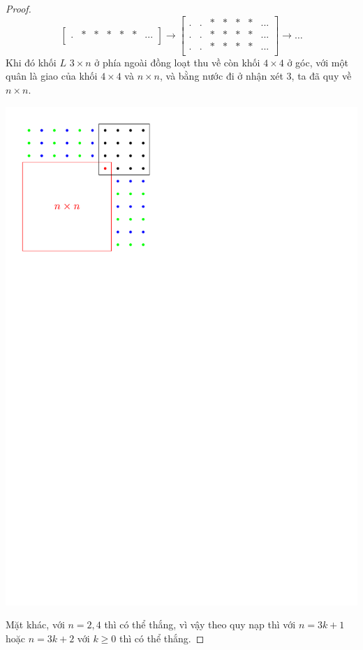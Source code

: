 \documentclass[11pt]{scrartcl}
\begin{document}
\begin{itemize}[label=, leftmargin=0em, itemsep=0.5em]
\begin{sol}
\begin{proof}
\[\begin{bmatrix}
                    . & * & *&*&*&*&...\\
                \end{bmatrix}
            \to 
                \begin{bmatrix}
                    . & . & *&*&*&*&...\\
                    . & . & *&*&*&*&...\\
                    . & . & *&*&*&*&...\\
                \end{bmatrix}
                \to \dots
            \]
            Khi đó khối $L$ $3 \times n$ ở phía ngoài đồng loạt thu về còn khối $4 \times 4$ ở góc, với một quân là giao của khối $4 \times 4$ và $n \times n$, và bằng nước đi ở nhận xét 3, ta đã quy về $n \times n$.
            \begin{center}
                \includegraphics[scale=0.7]{Image/1993.pdf}
            \end{center}
            Mặt khác, với $n = 2,4$ thì có thể thắng, vì vậy theo quy nạp thì với $n = 3k + 1$ hoặc $n = 3k + 2$ với $k \geq 0$ thì có thể thắng.
        \end{proof}
    \end{sol}



\end{itemize}
\end{document}
